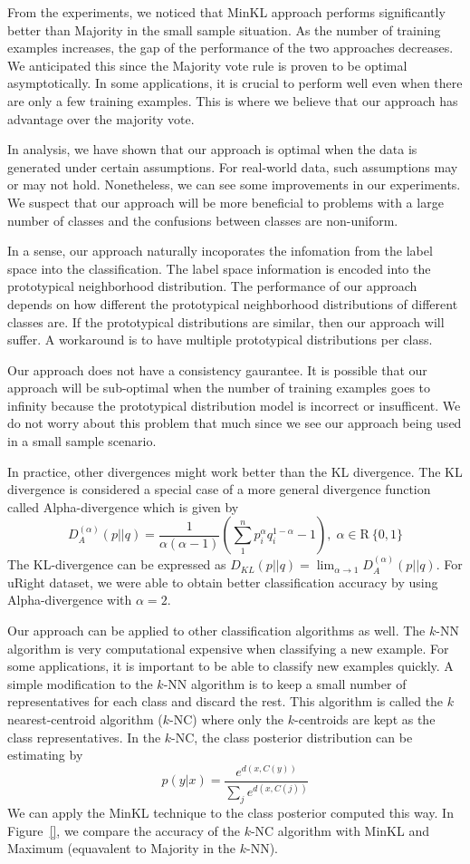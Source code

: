 \documentclass{article}
\begin{document}
From the experiments, we noticed that MinKL approach performs
significantly better than Majority in the small sample situation. As
the number of training examples increases, the gap of the performance
of the two approaches decreases. We anticipated this since the
Majority vote rule is proven to be optimal asymptotically. In some
applications, it is crucial to perform well even when there are only a
few training examples. This is where we believe that our approach has
advantage over the majority vote.

In analysis, we have shown that our approach is optimal when the data
is generated under certain assumptions. For real-world data,
such assumptions may or may not hold. Nonetheless, we can see some
improvements in our experiments. We suspect that our approach will be
more beneficial to problems with a large number of classes and the
confusions between classes are non-uniform. 

In a sense, our approach naturally incoporates the infomation from the
label space into the classification. The label space information is
encoded into the prototypical neighborhood distribution. The
performance of our approach depends on how
different the prototypical neighborhood distributions of different
classes are. If the prototypical distributions are similar, then our
approach will suffer. A workaround is to have multiple prototypical
distributions per class. 

Our approach does not have a consistency gaurantee. It is
possible that our approach will be sub-optimal when the number of
training examples goes to infinity because the prototypical
distribution model is incorrect or insufficent. We do not worry
about this problem that much since we see our approach being used
in a small sample scenario.

In practice, other divergences might work better than the KL
divergence. The KL divergence is considered a special case of a
more general divergence function called Alpha-divergence which is
given by
\[
D^{(\alpha)}_A (p||q) = \frac{1}{\alpha(\alpha - 1)}\left( \sum_1^n
  p^{\alpha}_i q^{1-\alpha}_i - 1\right), \; \alpha \in \mathrm{R} \ \{0,1\}
\]
The KL-divergence can be expressed as $D_{KL} (p || q) = \lim_{\alpha
\rightarrow 1} D^{(\alpha)}_A (p || q)$. 
For uRight dataset, we were able to obtain better classification
accuracy by using Alpha-divergence with $\alpha = 2$.

Our approach can be applied to other classification algorithms as
well. The $k$-NN algorithm is very computational expensive when
classifying a new example. For some applications, it is
important to be able to classify new examples quickly. A simple
modification to the $k$-NN algorithm is to keep a small number of
representatives for each class and discard the rest. This algorithm is
called the $k$ nearest-centroid algorithm ($k$-NC) where only the
$k$-centroids are kept as the class representatives. In the $k$-NC,
the class posterior distribution can be estimating by
\[
p(y|x) = \frac{e^{d(x,C(y))}}{\sum_j e^{d(x, C(j))} }
\]
We can apply the MinKL technique to the class posterior computed this
way. In Figure~\ref{}, we compare the accuracy of the $k$-NC algorithm
with MinKL and Maximum (equavalent to Majority in the $k$-NN).
\end{document}
